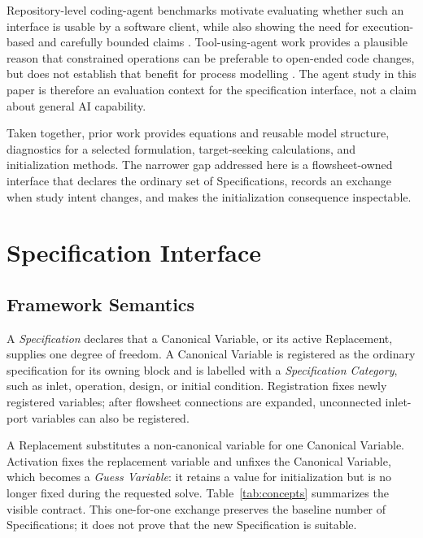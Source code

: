 \documentclass[10pt,letterpaper]{article}
\begin{document}
Repository-level coding-agent benchmarks motivate evaluating whether such an interface is usable by a software client, while also showing the need for execution-based and carefully bounded claims \cite{jimenez2024swebench}. Tool-using-agent work provides a plausible reason that constrained operations can be preferable to open-ended code changes, but does not establish that benefit for process modelling \cite{yao2023react}. The agent study in this paper is therefore an evaluation context for the specification interface, not a claim about general AI capability.

Taken together, prior work provides equations and reusable model structure, diagnostics for a selected formulation, target-seeking calculations, and initialization methods. The narrower gap addressed here is a flowsheet-owned interface that declares the ordinary set of Specifications, records an exchange when study intent changes, and makes the initialization consequence inspectable.

\section{Specification Interface}

\subsection{Framework Semantics}
A \emph{Specification} declares that a Canonical Variable, or its active Replacement, supplies one degree of freedom. A Canonical Variable is registered as the ordinary specification for its owning block and is labelled with a \emph{Specification Category}, such as inlet, operation, design, or initial condition. Registration fixes newly registered variables; after flowsheet connections are expanded, unconnected inlet-port variables can also be registered.

A Replacement substitutes a non-canonical variable for one Canonical Variable. Activation fixes the replacement variable and unfixes the Canonical Variable, which becomes a \emph{Guess Variable}: it retains a value for initialization but is no longer fixed during the requested solve. Table~\ref{tab:concepts} summarizes the visible contract. This one-for-one exchange preserves the baseline number of Specifications; it does not prove that the new Specification is suitable.
\end{document}
